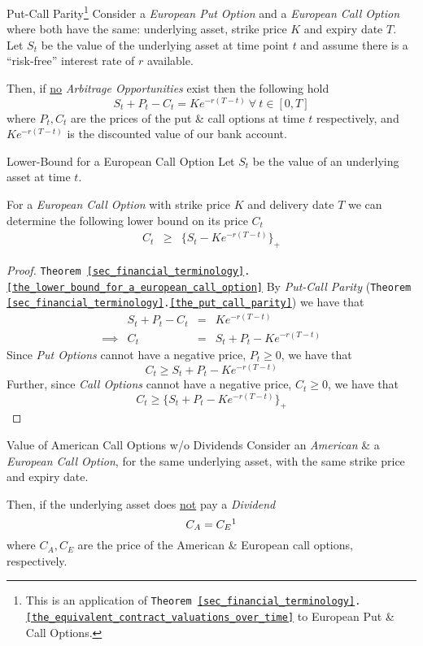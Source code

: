 \documentclass[11pt,a4paper]{article}
\begin{document}
  \begin{theorem}{Put-Call Parity\footnote{This is an application of \texttt{Theorem \ref{sec_financial_terminology}.\ref{the_equivalent_contract_valuations_over_time}} to European Put \& Call Options.}}\label{the_put_call_parity}
    Consider a \textit{European Put Option} and a \textit{European Call Option} where both have the same: underlying asset, strike price $K$ and expiry date $T$. Let $S_t$ be the value of the underlying asset at time point $t$ and assume there is a ``risk-free'' interest rate of $r$ available.
    \par Then, if \underline{no} \textit{Arbitrage Opportunities} exist then the following hold
    \[ S_t+P_t-C_t=Ke^{-r(T-t)}\ \forall\ t\in[0,T] \]
    where $P_t,C_t$ are the prices of the put \& call options at time $t$ respectively, and $Ke^{-r(T-t)}$ is the discounted value of our bank account.
  \end{theorem}

  \begin{theorem}{Lower-Bound for a European Call Option}\label{the_lower_bound_for_a_european_call_option}
     Let $S_t$ be the value of an underlying asset at time $t$.
     \par For a \textit{European Call Option} with strike price $K$ and delivery date $T$ we can determine the following lower bound on its price $C_t$
    \[\begin{array}{rcl}
      C_t&\geq&\{S_t-Ke^{-r(T-t)}\}_+
    \end{array}\]
  \end{theorem}

  \begin{proof}{\texttt{Theorem \ref{sec_financial_terminology}.\ref{the_lower_bound_for_a_european_call_option}} }
    By \textit{Put-Call Parity} (\texttt{Theorem \ref{sec_financial_terminology}.\ref{the_put_call_parity}}) we have that
    \[\begin{array}{rrcl}
      &S_t+P_t-C_t&=&Ke^{-r(T-t)}\\
      \implies&C_t&=&S_t+P_t-Ke^{-r(T-t)}
    \end{array}\]
    Since \textit{Put Options} cannot have a negative price, $P_t\geq0$, we have that
    \[ C_t\geq S_t+P_t-Ke^{-r(T-t)} \]
    Further, since \textit{Call Options} cannot have a negative price, $C_t\geq0$, we have that
    \[ C_t\geq \big\{S_t+P_t-Ke^{-r(T-t)}\big\}_+ \]
  \end{proof}

  \begin{theorem}{Value of American Call Options w/o Dividends}\label{the_value_of_america_call_options_wo_dividends}
    Consider an \textit{American} \& a \textit{European Call Option}, for the same underlying asset, with the same strike price and expiry date.
    \par Then, if the underlying asset does \underline{not} pay a \textit{Dividend}
    \[ C_A=C_E\footnotemark \]
    where $C_A,C_E$ are the price of the American \& European call options, respectively.
  \end{theorem}
\end{document}
